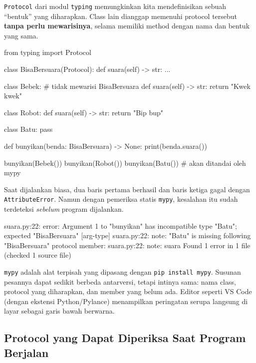 \texttt{Protocol} dari modul \texttt{typing} memungkinkan kita mendefinisikan sebuah ``bentuk'' yang diharapkan. Class lain dianggap memenuhi protocol tersebut \textbf{tanpa perlu mewarisinya}, selama memiliki method dengan nama dan bentuk yang sama.

\begin{kode}[suara.py]
from typing import Protocol

class BisaBersuara(Protocol):
    def suara(self) -> str: ...

class Bebek:                       # tidak mewarisi BisaBersuara
    def suara(self) -> str:
        return "Kwek kwek"

class Robot:
    def suara(self) -> str:
        return "Bip bup"

class Batu:
    pass

def bunyikan(benda: BisaBersuara) -> None:
    print(benda.suara())

bunyikan(Bebek())
bunyikan(Robot())
bunyikan(Batu())                   # akan ditandai oleh mypy
\end{kode}

Saat dijalankan biasa, dua baris pertama berhasil dan baris ketiga gagal dengan \texttt{AttributeError}. Namun dengan pemeriksa statis \texttt{mypy}, kesalahan itu sudah terdeteksi \emph{sebelum} program dijalankan.

\begin{keluaran}
suara.py:22: error: Argument 1 to "bunyikan" has incompatible type "Batu"; expected "BisaBersuara"  [arg-type]
suara.py:22: note: "Batu" is missing following "BisaBersuara" protocol member:
suara.py:22: note:     suara
Found 1 error in 1 file (checked 1 source file)
\end{keluaran}

\begin{info}
\texttt{mypy} adalah alat terpisah yang dipasang dengan \texttt{pip install mypy}. Susunan pesannya dapat sedikit berbeda antarversi, tetapi intinya sama: nama class, protocol yang diharapkan, dan member yang belum ada. Editor seperti VS Code (dengan ekstensi Python/Pylance) menampilkan peringatan serupa langsung di layar sebagai garis bawah berwarna.
\end{info}

\subsection{Protocol yang Dapat Diperiksa Saat Program Berjalan}

